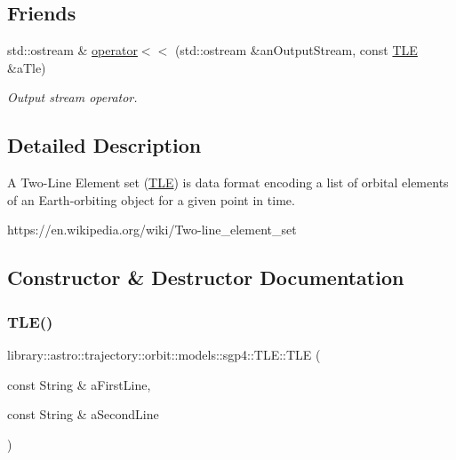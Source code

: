 \subsection*{Friends}
\begin{DoxyCompactItemize}
\item 
std\+::ostream \& \hyperlink{classlibrary_1_1astro_1_1trajectory_1_1orbit_1_1models_1_1sgp4_1_1_t_l_e_a54a7a3bca65674d5052031634f900984}{operator$<$$<$} (std\+::ostream \&an\+Output\+Stream, const \hyperlink{classlibrary_1_1astro_1_1trajectory_1_1orbit_1_1models_1_1sgp4_1_1_t_l_e}{T\+LE} \&a\+Tle)
\begin{DoxyCompactList}\small\item\em Output stream operator. \end{DoxyCompactList}\end{DoxyCompactItemize}


\subsection{Detailed Description}
A Two-\/\+Line Element set (\hyperlink{classlibrary_1_1astro_1_1trajectory_1_1orbit_1_1models_1_1sgp4_1_1_t_l_e}{T\+LE}) is data format encoding a list of orbital elements of an Earth-\/orbiting object for a given point in time. 

https\+://en.wikipedia.\+org/wiki/\+Two-\/line\+\_\+element\+\_\+set 

\subsection{Constructor \& Destructor Documentation}
\mbox{\label{classlibrary_1_1astro_1_1trajectory_1_1orbit_1_1models_1_1sgp4_1_1_t_l_e_a4d2b43f02cef44f0c9635daf9946261c}} 
\subsubsection{\texorpdfstring{T\+L\+E()}{TLE()}\hspace{0.1cm}{\footnotesize\ttfamily [1/2]}}
{\footnotesize\ttfamily library\+::astro\+::trajectory\+::orbit\+::models\+::sgp4\+::\+T\+L\+E\+::\+T\+LE (\begin{DoxyParamCaption}\item[{const String \&}]{a\+First\+Line,  }\item[{const String \&}]{a\+Second\+Line }\end{DoxyParamCaption})}



